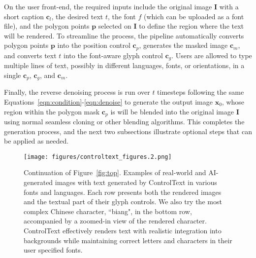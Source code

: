 On the user front-end, the required inputs include the original image $\boldsymbol{I}$ with a short caption $\boldsymbol{c}_{l}$, the desired text $t$, the font $f$ (which can be uploaded as a font file), and the polygon points $\boldsymbol{p}$ selected on $\boldsymbol{I}$ to define the region where the text will be rendered.
To streamline the process, the pipeline automatically converts polygon points $\boldsymbol{p}$ into the position control $\boldsymbol{c}_{p}$, generates the masked image $\boldsymbol{c}_{m}$, and converts text $t$ into the font-aware glyph control $\boldsymbol{c}_{g}$. 
Users are allowed to type multiple lines of text, possibly in different languages, fonts, or orientations, in a single $\boldsymbol{c}_{p}$, $\boldsymbol{c}_{g}$, and $\boldsymbol{c}_{m}$.

Finally, the reverse denoising process is run over $t$ timesteps following the same Equations~\ref{eqn:condition}-\ref{eqn:denoise} to generate the output image $\boldsymbol{x}_{0}$, whose region within the polygon mask $\boldsymbol{c}_{p}$ is will be blended into the original image $\boldsymbol{I}$ using normal seamless cloning or other blending algorithms. This completes the generation process, and the next two subsections illustrate optional steps that can be applied as needed.

\begin{figure*}[!t]
    \centering
    \texttt{[image: figures/controltext\_figures.2.png]}
    \caption{Continuation of Figure~\ref{fig:top}. Examples of real-world and AI-generated images with text generated by ControlText in various fonts and languages. Each row presents both the rendered images and the textual part of their glyph controls. We also try the most complex Chinese character, ``biang", in the bottom row, accompanied by a zoomed-in view of the rendered character. ControlText effectively renders text with realistic integration into backgrounds while maintaining correct letters and characters in their user specified fonts.}
    \label{fig:main}
\end{figure*}



